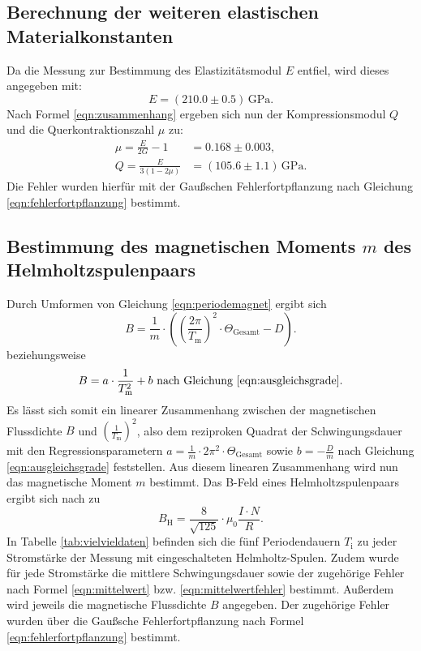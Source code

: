 \subsection{Berechnung der weiteren elastischen Materialkonstanten}
Da die Messung zur Bestimmung des Elastizitätsmodul $E$ entfiel, wird dieses angegeben mit:
\begin{equation*}
	E= (210.0 \pm 0.5 )\,\si{\giga\pascal} \text{.}
\end{equation*}
Nach Formel \eqref{eqn:zusammenhang} ergeben sich nun der Kompressionsmodul $Q$ und die Querkontraktionszahl $\mu$ zu:
\begin{align*}
	\mu  = \frac{E}{2G}-1       & = 0.168\pm 0.003 \mathrm{,}                     \\
	Q    = \frac{E}{3(1-2 \mu)} & = (105.6\pm 1.1) \,\si{\giga\pascal} \mathrm{.}
\end{align*}
Die Fehler wurden hierfür mit der Gaußschen Fehlerfortpflanzung nach Gleichung \eqref{eqn:fehlerfortpflanzung} bestimmt.
\subsection{Bestimmung des magnetischen Moments $m$ des Helmholtzspulenpaars}
Durch Umformen von Gleichung \eqref{eqn:periodemagnet} ergibt sich
\begin{equation}
	\label{eqn:linearB}
	B=\frac{1}{m}\cdot \left(\left(\frac{2\pi}{T_\mathrm{m}}\right)^2 \cdot \Theta_{\mathrm{Gesamt}}-D\right) \text{.}
\end{equation}
beziehungsweise
\begin{equation*}
	B=a\cdot\frac{1}{T_{\mathrm{m}}^2}+b \text{  nach Gleichung \eqref{eqn:ausgleichsgrade}.}
\end{equation*}
Es lässt sich somit ein linearer Zusammenhang zwischen der magnetischen Flussdichte $B$ und $\left(\frac{1}{T_{\mathrm{m}}}\right)^2$, also dem reziproken Quadrat der Schwingungsdauer mit den Regressionsparametern $a=\frac{1}{m}\cdot 2\pi^2 \cdot \Theta_{\mathrm{Gesamt}}$ sowie $b=-\frac{D}{m}$ nach Gleichung \eqref{eqn:ausgleichsgrade} feststellen.
Aus diesem linearen Zusammenhang wird nun das magnetische Moment $m$ bestimmt.
Das B-Feld eines Helmholtzspulenpaars ergibt sich nach \cite{LordHelmchen} zu
\begin{equation}
	\label{eqn:MisterMagneto}
	B_{\mathrm{H}}= \frac{8}{\sqrt{125}}\cdot \mu_{\mathrm{0}} \frac{I\cdot N}{R} \text{.}
\end{equation}
In Tabelle \ref{tab:vielvieldaten} befinden sich die fünf Periodendauern $T_{\mathrm{i}}$ zu jeder Stromstärke der Messung mit eingeschalteten Helmholtz-Spulen.
Zudem wurde für jede Stromstärke die mittlere Schwingungsdauer sowie der zugehörige Fehler nach Formel \eqref{eqn:mittelwert} bzw. \eqref{eqn:mittelwertfehler} bestimmt.
Außerdem wird jeweils die magnetische Flussdichte $B$ angegeben. Der zugehörige Fehler wurden über die Gaußsche Fehlerfortpflanzung nach Formel \eqref{eqn:fehlerfortpflanzung} bestimmt.

